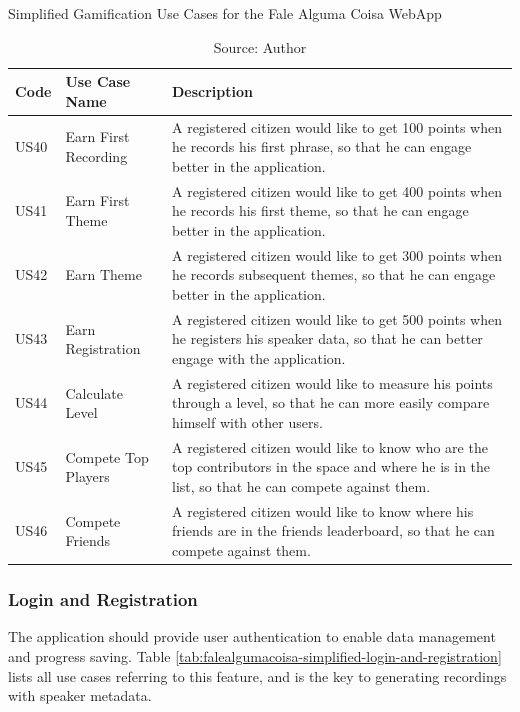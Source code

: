 \begin{table}[h]
\caption{Simplified Gamification Use Cases for the Fale Alguma Coisa WebApp}
\label{tab:falealgumacoisa-simplified-gamification}
\centering
\begin{tabular}{|p{1cm}|p{3cm}|p{10cm}|}
\hline
    Code & Use Case Name & Description \\ \hline
    US40 & Earn First Recording & A registered citizen would like to get 100 points when he records his first phrase, so that he can engage better in the application. \\ \hline
    US41 & Earn First Theme & A registered citizen would like to get 400 points when he records his first theme, so that he can engage better in the application. \\ \hline
    US42 & Earn Theme & A registered citizen would like to get 300 points when he records subsequent themes, so that he can engage better in the application. \\ \hline
    US43 & Earn Registration & A registered citizen would like to get 500 points when he registers his speaker data, so that he can better engage with the application. \\ \hline
    US44 & Calculate Level & A registered citizen would like to measure his points through a level, so that he can more easily compare himself with other users. \\ \hline
    US45 & Compete Top Players & A registered citizen would like to know who are the top contributors in the space and where he is in the list, so that he can compete against them. \\ \hline
    US46 & Compete Friends & A registered citizen would like to know where his friends are in the friends leaderboard, so that he can compete against them. \\ \hline
\end{tabular}
\caption*{Source: Author}
\end{table}

\subsubsection{Login and Registration}

The application should provide user authentication to enable data management and progress saving. Table \ref{tab:falealgumacoisa-simplified-login-and-registration} lists all use cases referring to this feature, and is the key to generating recordings with speaker metadata.

